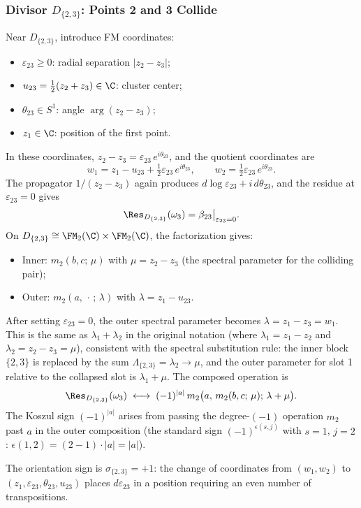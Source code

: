 \subsubsection{Divisor $D_{\{2,3\}}$: Points 2 and 3 Collide}

\begin{computation}[$D_{\{2,3\}}$ residue]
\label{comp:D23}
Near $D_{\{2,3\}}$, introduce FM coordinates:
\begin{itemize}
\item $\varepsilon_{23} \geq 0$: radial separation $|z_2 - z_3|$;
\item $u_{23} = \tfrac{1}{2}(z_2 + z_3) \in \C$: cluster center;
\item $\theta_{23} \in S^1$: angle $\arg(z_2 - z_3)$;
\item $z_1 \in \C$: position of the first point.
\end{itemize}
In these coordinates, $z_2 - z_3 = \varepsilon_{23}\, e^{i\theta_{23}}$, and the quotient coordinates are
\[
w_1 = z_1 - u_{23} + \tfrac{1}{2}\varepsilon_{23}\, e^{i\theta_{23}}, \qquad
w_2 = \tfrac{1}{2}\varepsilon_{23}\, e^{i\theta_{23}}.
\]
The propagator $1/(z_2 - z_3)$ again produces $d\log\varepsilon_{23} + i\, d\theta_{23}$, and the residue at $\varepsilon_{23} = 0$ gives
\[
\Res_{D_{\{2,3\}}}(\omega_3) = \beta_{23}\big|_{\varepsilon_{23}=0}.
\]
On $D_{\{2,3\}} \cong \FM_2(\C) \times \FM_2(\C)$, the factorization gives:
\begin{itemize}
\item Inner: $m_2(b, c;\, \mu)$ with $\mu = z_2 - z_3$ (the spectral parameter for the colliding pair);
\item Outer: $m_2(a,\, \cdot\,;\, \lambda)$ with $\lambda = z_1 - u_{23}$.
\end{itemize}
After setting $\varepsilon_{23} = 0$, the outer spectral parameter becomes $\lambda = z_1 - z_3 = w_1$. This is the same as $\lambda_1 + \lambda_2$ in the original notation (where $\lambda_1 = z_1 - z_2$ and $\lambda_2 = z_2 - z_3 = \mu$), consistent with the spectral substitution rule: the inner block $\{2,3\}$ is replaced by the sum $\Lambda_{\{2,3\}} = \lambda_2 \to \mu$, and the outer parameter for slot 1 relative to the collapsed slot is $\lambda_1 + \mu$. The composed operation is
\[
\Res_{D_{\{2,3\}}}(\omega_3) \;\longleftrightarrow\; (-1)^{|a|}\, m_2\bigl(a,\, m_2(b,c;\,\mu);\, \lambda + \mu\bigr).
\]
The Koszul sign $(-1)^{|a|}$ arises from passing the degree-$(-1)$ operation $m_2$ past $a$ in the outer composition (the standard sign $(-1)^{\epsilon(s,j)}$ with $s=1$, $j=2$: $\epsilon(1,2) = (2-1)\cdot |a| = |a|$).

The orientation sign is $\sigma_{\{2,3\}} = +1$: the change of coordinates from $(w_1, w_2)$ to $(z_1, \varepsilon_{23}, \theta_{23}, u_{23})$ places $d\varepsilon_{23}$ in a position requiring an even number of transpositions.
\end{computation}

